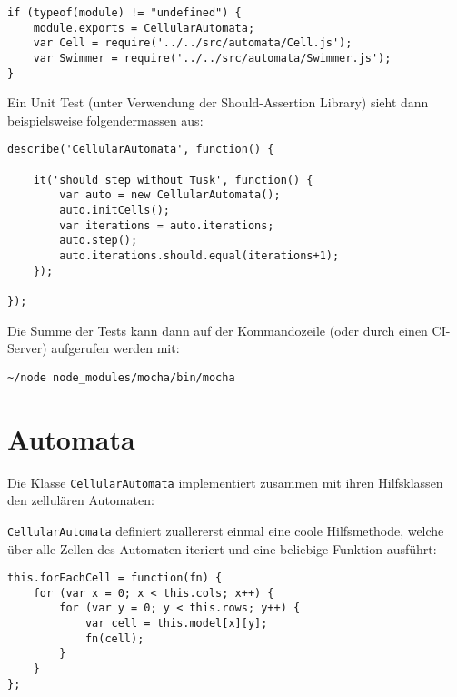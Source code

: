 \documentclass[11pt]{scrreprt} %
\theoremstyle{definition}
\begin{document}
\begin{lstlisting}
if (typeof(module) != "undefined") {
	module.exports = CellularAutomata;
	var Cell = require('../../src/automata/Cell.js');
	var Swimmer = require('../../src/automata/Swimmer.js');
}
\end{lstlisting}

Ein Unit Test (unter Verwendung der Should-Assertion Library) sieht dann beispielsweise folgendermassen aus:

\begin{lstlisting}
describe('CellularAutomata', function() {

	it('should step without Tusk', function() {
		var auto = new CellularAutomata();
		auto.initCells();
		var iterations = auto.iterations;
		auto.step();
		auto.iterations.should.equal(iterations+1);
	});

});
\end{lstlisting}

Die Summe der Tests kann dann auf der Kommandozeile (oder durch einen CI-Server) aufgerufen werden mit:
\begin{verbatim}
~/node node_modules/mocha/bin/mocha
\end{verbatim}

\section{Automata}

Die Klasse {\tt CellularAutomata} implementiert zusammen mit ihren Hilfsklassen den zellulären Automaten:


{\tt CellularAutomata} definiert zuallererst einmal eine coole Hilfsmethode, welche über alle Zellen des Automaten iteriert und eine beliebige Funktion ausführt:

\begin{lstlisting}
this.forEachCell = function(fn) {
	for (var x = 0; x < this.cols; x++) {
		for (var y = 0; y < this.rows; y++) {
			var cell = this.model[x][y];
			fn(cell);
		}
	}
};
\end{lstlisting}
\end{document}
